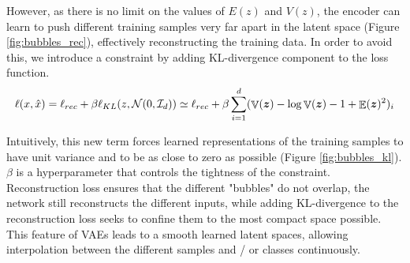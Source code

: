 However, as there is no limit on the values of $E(z)$ and $V(z)$, the encoder can learn to push different training samples very far apart in the latent space (Figure \ref{fig:bubbles_rec}), effectively reconstructing the training data. In order to avoid this, we introduce a constraint by adding KL-divergence component to the loss function.
\begin{align*}
    \ell(x, \hat{x}) = \ell_{rec} + \beta \ell_{KL} (z, \mathcal{N}(0, \mathcal{I}_d)) \simeq \ell_{rec} + \beta\sum_{i=1}^d (\mathop{\mathbb{V}}(\vect{z}) - \log{\mathop{\mathbb{V}}(\vect{z})} - 1 + \mathop{\mathbb{E}}(\vect{z})^2)_i
\end{align*}

Intuitively, this new term forces learned representations of the training samples to have unit variance and to be as close to zero as possible (Figure \ref{fig:bubbles_kl}). $\beta$ is a hyperparameter that controls the tightness of the constraint. Reconstruction loss ensures that the different "bubbles" do not overlap, the network still reconstructs the different inputs, while adding KL-divergence to the reconstruction loss seeks to confine them to the most compact space possible. This feature of VAEs leads to a smooth learned latent spaces, allowing interpolation between the different samples and / or classes continuously.

